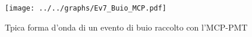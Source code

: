 \begin{figure}[h] \centering \texttt{[image: ../../graphs/Ev7\_Buio\_MCP.pdf]}\caption{Tpica forma d'onda di un evento di buio raccolto con l'MCP-PMT}\label{gr:Ev7_Buio_MCP} \end{figure}
